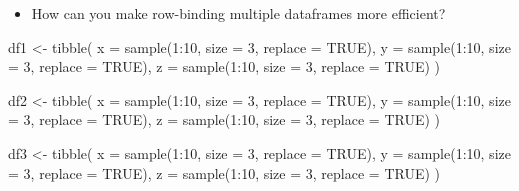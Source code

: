 \documentclass[
]{book}
\newenvironment{Shaded}{\begin{snugshade}}{\end{snugshade}}
\newcommand{\AttributeTok}[1]{\textcolor[rgb]{0.77,0.63,0.00}{#1}}
\newcommand{\ConstantTok}[1]{\textcolor[rgb]{0.00,0.00,0.00}{#1}}
\newcommand{\DecValTok}[1]{\textcolor[rgb]{0.00,0.00,0.81}{#1}}
\newcommand{\FunctionTok}[1]{\textcolor[rgb]{0.00,0.00,0.00}{#1}}
\newcommand{\NormalTok}[1]{#1}
\newcommand{\OtherTok}[1]{\textcolor[rgb]{0.56,0.35,0.01}{#1}}
\newcommand{\SpecialCharTok}[1]{\textcolor[rgb]{0.00,0.00,0.00}{#1}}
\providecommand{\tightlist}{%
  \setlength{\itemsep}{0pt}\setlength{\parskip}{0pt}}
\begin{document}
\begin{itemize}
\tightlist
\item
  How can you make row-binding multiple dataframes more efficient?
\end{itemize}

\begin{Shaded}
\begin{Highlighting}[]
\NormalTok{df1 }\OtherTok{\textless{}{-}} \FunctionTok{tibble}\NormalTok{(}
  \AttributeTok{x =} \FunctionTok{sample}\NormalTok{(}\DecValTok{1}\SpecialCharTok{:}\DecValTok{10}\NormalTok{, }\AttributeTok{size =} \DecValTok{3}\NormalTok{, }\AttributeTok{replace =} \ConstantTok{TRUE}\NormalTok{),}
  \AttributeTok{y =} \FunctionTok{sample}\NormalTok{(}\DecValTok{1}\SpecialCharTok{:}\DecValTok{10}\NormalTok{, }\AttributeTok{size =} \DecValTok{3}\NormalTok{, }\AttributeTok{replace =} \ConstantTok{TRUE}\NormalTok{),}
  \AttributeTok{z =} \FunctionTok{sample}\NormalTok{(}\DecValTok{1}\SpecialCharTok{:}\DecValTok{10}\NormalTok{, }\AttributeTok{size =} \DecValTok{3}\NormalTok{, }\AttributeTok{replace =} \ConstantTok{TRUE}\NormalTok{)}
\NormalTok{)}

\NormalTok{df2 }\OtherTok{\textless{}{-}} \FunctionTok{tibble}\NormalTok{(}
  \AttributeTok{x =} \FunctionTok{sample}\NormalTok{(}\DecValTok{1}\SpecialCharTok{:}\DecValTok{10}\NormalTok{, }\AttributeTok{size =} \DecValTok{3}\NormalTok{, }\AttributeTok{replace =} \ConstantTok{TRUE}\NormalTok{),}
  \AttributeTok{y =} \FunctionTok{sample}\NormalTok{(}\DecValTok{1}\SpecialCharTok{:}\DecValTok{10}\NormalTok{, }\AttributeTok{size =} \DecValTok{3}\NormalTok{, }\AttributeTok{replace =} \ConstantTok{TRUE}\NormalTok{),}
  \AttributeTok{z =} \FunctionTok{sample}\NormalTok{(}\DecValTok{1}\SpecialCharTok{:}\DecValTok{10}\NormalTok{, }\AttributeTok{size =} \DecValTok{3}\NormalTok{, }\AttributeTok{replace =} \ConstantTok{TRUE}\NormalTok{)}
\NormalTok{)}

\NormalTok{df3 }\OtherTok{\textless{}{-}} \FunctionTok{tibble}\NormalTok{(}
  \AttributeTok{x =} \FunctionTok{sample}\NormalTok{(}\DecValTok{1}\SpecialCharTok{:}\DecValTok{10}\NormalTok{, }\AttributeTok{size =} \DecValTok{3}\NormalTok{, }\AttributeTok{replace =} \ConstantTok{TRUE}\NormalTok{),}
  \AttributeTok{y =} \FunctionTok{sample}\NormalTok{(}\DecValTok{1}\SpecialCharTok{:}\DecValTok{10}\NormalTok{, }\AttributeTok{size =} \DecValTok{3}\NormalTok{, }\AttributeTok{replace =} \ConstantTok{TRUE}\NormalTok{),}
  \AttributeTok{z =} \FunctionTok{sample}\NormalTok{(}\DecValTok{1}\SpecialCharTok{:}\DecValTok{10}\NormalTok{, }\AttributeTok{size =} \DecValTok{3}\NormalTok{, }\AttributeTok{replace =} \ConstantTok{TRUE}\NormalTok{)}
\NormalTok{)}
\end{Highlighting}
\end{Shaded}
\end{document}
